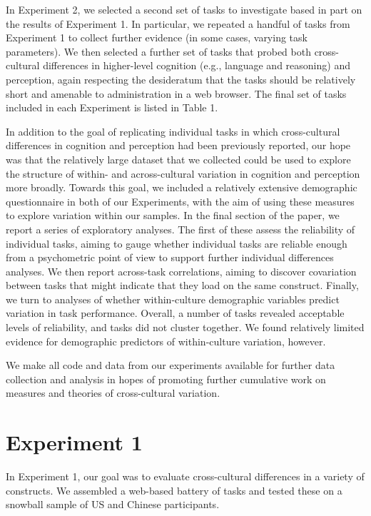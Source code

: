 \documentclass[
  man]{apa6}
\begin{document}
In Experiment 2, we selected a second set of tasks to investigate based in part on the results of Experiment 1. In particular, we repeated a handful of tasks from Experiment 1 to collect further evidence (in some cases, varying task parameters). We then selected a further set of tasks that probed both cross-cultural differences in higher-level cognition (e.g., language and reasoning) and perception, again respecting the desideratum that the tasks should be relatively short and amenable to administration in a web browser. The final set of tasks included in each Experiment is listed in Table 1.

In addition to the goal of replicating individual tasks in which cross-cultural differences in cognition and perception had been previously reported, our hope was that the relatively large dataset that we collected could be used to explore the structure of within- and across-cultural variation in cognition and perception more broadly. Towards this goal, we included a relatively extensive demographic questionnaire in both of our Experiments, with the aim of using these measures to explore variation within our samples. In the final section of the paper, we report a series of exploratory analyses. The first of these assess the reliability of individual tasks, aiming to gauge whether individual tasks are reliable enough from a psychometric point of view to support further individual differences analyses. We then report across-task correlations, aiming to discover covariation between tasks that might indicate that they load on the same construct. Finally, we turn to analyses of whether within-culture demographic variables predict variation in task performance. Overall, a number of tasks revealed acceptable levels of reliability, and tasks did not cluster together. We found relatively limited evidence for demographic predictors of within-culture variation, however.

We make all code and data from our experiments available for further data collection and analysis in hopes of promoting further cumulative work on measures and theories of cross-cultural variation.

\hypertarget{experiment-1}{%
\section{Experiment 1}\label{experiment-1}}

In Experiment 1, our goal was to evaluate cross-cultural differences in a variety of constructs. We assembled a web-based battery of tasks and tested these on a snowball sample of US and Chinese participants.
\end{document}

